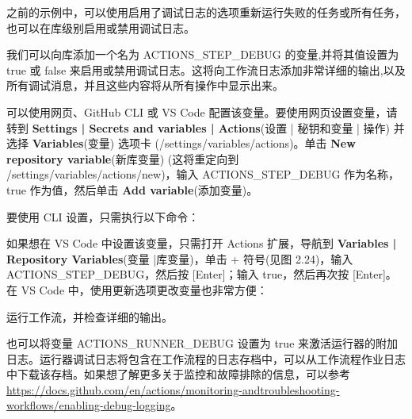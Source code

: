 
之前的示例中，可以使用启用了调试日志的选项重新运行失败的任务或所有任务，也可以在库级别启用或禁用调试日志。


我们可以向库添加一个名为 ACTIONS\_STEP\_DEBUG 的变量,并将其值设置为 true 或 false 来启用或禁用调试日志。这将向工作流日志添加非常详细的输出,以及所有调试消息，并且这些内容将从所有操作中显示出来。

可以使用网页、GitHub CLI 或 VS Code 配置该变量。要使用网页设置变量，请转到 \textbf{Settings | Secrets and variables | Actions}(设置 | 秘钥和变量 | 操作) 并选择 \textbf{Variables}(变量) 选项卡 (/settings/variables/actions)。单击 \textbf{New repository variable}(新库变量) (这将重定向到 /settings/variables/actions/new)，输入 ACTIONS\_STEP\_DEBUG 作为名称，true 作为值，然后单击 \textbf{Add variable}(添加变量)。

要使用 CLI 设置，只需执行以下命令：


如果想在 VS Code 中设置该变量，只需打开 Actions 扩展，导航到 \textbf{Variables | Repository Variables}(变量 |库变量)，单击 + 符号(见图 2.24)，输入 ACTIONS\_STEP\_DEBUG，然后按 [Enter]；输入 true，然后再次按 [Enter]。在 VS Code 中，使用更新选项更改变量也非常方便：


运行工作流，并检查详细的输出。


也可以将变量 ACTIONS\_RUNNER\_DEBUG 设置为 true 来激活运行器的附加日志。运行器调试日志将包含在工作流程的日志存档中，可以从工作流程作业日志中下载该存档。如果想了解更多关于监控和故障排除的信息，可以参考\url{https://docs.github.com/en/actions/monitoring-andtroubleshooting-workflows/enabling-debug-logging}。